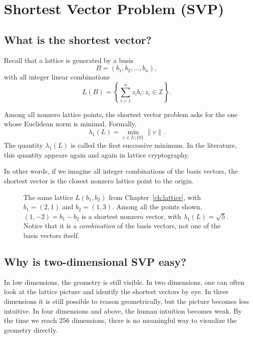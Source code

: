 \chapter{Shortest Vector Problem (SVP)}
\label{ch:svp}

\section{What is the shortest vector?}

Recall that a lattice is generated by a basis
\[
B=(b_1,b_2,\dots,b_n),
\]
with all integer linear combinations
\[
L(B)=\left\{\sum_{i=1}^n z_i b_i : z_i\in\mathbb{Z}\right\}.
\]

Among all nonzero lattice points, the shortest vector problem asks for the one whose Euclidean norm is minimal. Formally,
\[
\lambda_1(L)=\min_{v\in L\setminus\{0\}} \|v\|.
\]
The quantity $\lambda_1(L)$ is called the first successive minimum. In the literature, this quantity appears again and again in lattice cryptography.

In other words, if we imagine all integer combinations of the basis vectors, the shortest vector is the closest nonzero lattice point to the origin.

\begin{figure}[H]
\centering
{}
\caption{The same lattice $L(b_1,b_2)$ from Chapter~\ref{ch:lattice}, with $b_1=(2,1)$ and $b_2=(1,3)$. Among all the points shown, $(1,-2)=b_1-b_2$ is a shortest nonzero vector, with $\lambda_1(L)=\sqrt{5}$. Notice that it is a \emph{combination} of the basis vectors, not one of the basis vectors itself.}
\label{fig:svp}
\end{figure}

\section{Why is two-dimensional SVP easy?}

In low dimensions, the geometry is still visible. In two dimensions, one can often look at the lattice picture and identify the shortest vectors by eye. In three dimensions it is still possible to reason geometrically, but the picture becomes less intuitive. In four dimensions and above, the human intuition becomes weak. By the time we reach 256 dimensions, there is no meaningful way to visualize the geometry directly.

